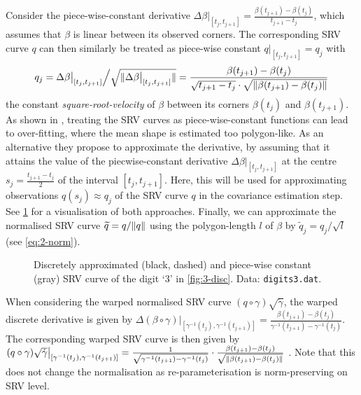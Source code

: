 Consider the piece-wise-constant derivative $\Delta \beta \big\rvert_{[t_j, t_{j+1}]} = \frac{\beta(t_{j+1}) - \beta(t_{j})}{t_{j+1} - t_j}$, which assumes that $\beta$ is linear between its observed corners. 
The corresponding SRV curve $q$ can then similarly be treated as piece-wise constant $q\big\rvert_{[t_{j},t_{j+1}]} = q_j$ with 
\begin{equation}
  q_j = \Delta \beta \big\rvert_{[t_j, t_{j+1}]} \Big/ \sqrt{\lVert\Delta \beta \big\rvert_{[t_j, t_{j+1}]}\rVert} = \frac{\beta(t_{j+1}) - \beta(t_j)}{\sqrt{t_{j+1} - t_j} \cdot \sqrt{\lVert\beta(t_{j+1}) - \beta(t_j)\rVert}}
\end{equation}
the constant \emph{square-root-velocity} of $\beta$ between its corners $\beta(t_j)$ and $\beta(t_{j+1})$.
As shown in \cite[][Fig.\ 3]{Steyer2021}, treating the SRV curves as piece-wise-constant functions can lead to over-fitting, where the mean shape is estimated too polygon-like.
As an alternative they propose to approximate the derivative, by assuming that it attains the value of the piecwise-constant derivative $\Delta \beta \big\rvert_{[t_j,t_{j+1}]}$ at the centre $s_j = \frac{t_{j+1} - t_j}{2}$ of the interval $[t_j, t_{j+1}]$.
Here, this will be used for approximating observations $q(s_j) \approx q_j$ of the SRV curve $q$ in the covariance estimation step.
See \cref{fig:3-disc-srv} for a visualisation of both approaches.
Finally, we can approximate the normalised SRV curve $\widetilde q = q / \lVert q\rVert$ using the polygon-length $l$ of $\beta$ by $\widetilde q_j = q_j \big/ \sqrt{l}$ (see \cref{eq:2-norm}).
\begin{figure}
  \centering
  \begin{subfigure}{.48\textwidth}
    \centering
  \end{subfigure}\hfill%
  \begin{subfigure}{.48\textwidth}
    \centering
    \begin{subfigure}{\textwidth}
      \centering
    \end{subfigure}
    \begin{subfigure}{\textwidth}
      \centering
    \end{subfigure}
  \end{subfigure}
  \caption{Discretely approximated (black, dashed) and piece-wise constant (gray) SRV curve of the digit \enquote*{3} in \cref{fig:3-disc}. Data: \texttt{digits3.dat}.}
  \label{fig:3-disc-srv}
\end{figure}
When considering the warped normalised SRV curve $(q \circ \gamma ) \sqrt{\dot\gamma}$, the warped discrete derivative is given by $\Delta (\beta \circ \gamma) \big\rvert_{[\gamma^{-1}(t_j), \gamma^{-1}(t_{j+1})]} = \frac{\beta(t_{j+1}) - \beta(t_{j})}{\gamma^{-1}(t_{j+1}) - \gamma^{-1}(t_j)}$.
The corresponding warped SRV curve is then given by $(q \circ \gamma) \sqrt{\dot\gamma} \big\rvert_{[\gamma^{-1}(t_j), \gamma^{-1}(t_{j+1})]} = \frac{1}{\sqrt{\gamma^{-1}(t_{j+1}) - \gamma^{-1}(t_j)}} \cdot \frac{\beta(t_{j+1}) - \beta(t_j)}{\sqrt{\lVert\beta(t_{j+1}) - \beta(t_j)\rVert}}$ \parencite[see][]{Steyer2021}.
Note that this does not change the normalisation as re-parameterisation is norm-preserving on SRV level.


